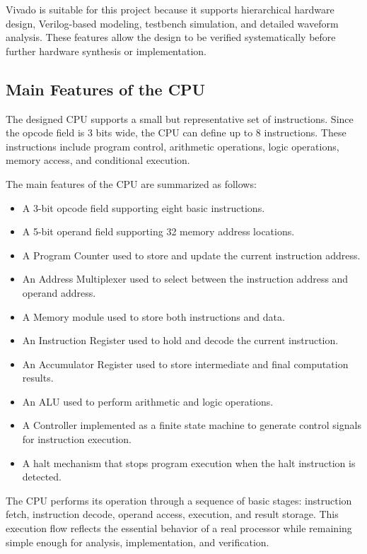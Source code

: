 Vivado is suitable for this project because it supports hierarchical hardware design, Verilog-based modeling, testbench simulation, and detailed waveform analysis. These features allow the design to be verified systematically before further hardware synthesis or implementation.

\subsection{Main Features of the CPU}

The designed CPU supports a small but representative set of instructions. Since the opcode field is 3 bits wide, the CPU can define up to 8 instructions. These instructions include program control, arithmetic operations, logic operations, memory access, and conditional execution.

The main features of the CPU are summarized as follows:

\begin{itemize}
	\item A 3-bit opcode field supporting eight basic instructions.
	\item A 5-bit operand field supporting 32 memory address locations.
	\item A Program Counter used to store and update the current instruction address.
	\item An Address Multiplexer used to select between the instruction address and operand address.
	\item A Memory module used to store both instructions and data.
	\item An Instruction Register used to hold and decode the current instruction.
	\item An Accumulator Register used to store intermediate and final computation results.
	\item An ALU used to perform arithmetic and logic operations.
	\item A Controller implemented as a finite state machine to generate control signals for instruction execution.
	\item A halt mechanism that stops program execution when the halt instruction is detected.
\end{itemize}

The CPU performs its operation through a sequence of basic stages: instruction fetch, instruction decode, operand access, execution, and result storage. This execution flow reflects the essential behavior of a real processor while remaining simple enough for analysis, implementation, and verification.

